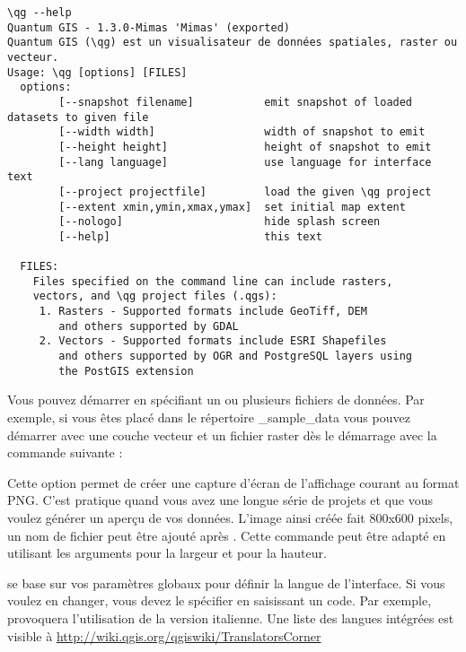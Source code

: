 \small
\begin{verbatim}
\qg --help
Quantum GIS - 1.3.0-Mimas 'Mimas' (exported)
Quantum GIS (\qg) est un visualisateur de données spatiales, raster ou vecteur.
Usage: \qg [options] [FILES]
  options:
		[--snapshot filename]           emit snapshot of loaded datasets to given file
		[--width width]                 width of snapshot to emit
		[--height height]               height of snapshot to emit
		[--lang language]               use language for interface text
		[--project projectfile]         load the given \qg project
		[--extent xmin,ymin,xmax,ymax]  set initial map extent
		[--nologo]                      hide splash screen
		[--help]                        this text

  FILES:
    Files specified on the command line can include rasters,
    vectors, and \qg project files (.qgs):
     1. Rasters - Supported formats include GeoTiff, DEM
        and others supported by GDAL
     2. Vectors - Supported formats include ESRI Shapefiles
        and others supported by OGR and PostgreSQL layers using
        the PostGIS extension
\end{verbatim}
\normalsize

\begin{Tip} \caption{\textsc{Exemple utilisant des options de ligne de commande}}
Vous pouvez démarrer \qg en spécifiant un ou plusieurs fichiers de données. Par exemple, si vous êtes placé dans le répertoire \qg\_sample\_data vous pouvez démarrer \qg avec une couche vecteur et un fichier raster dès le démarrage avec la commande suivante : 
\end{Tip}

Cette option permet de créer une capture d'écran de l'affichage courant au format PNG. C'est pratique quand vous avez une longue série de projets et que vous voulez générer un aperçu de vos données. L'image ainsi créée fait 800x600 pixels, un nom de fichier peut être ajouté après . Cette commande peut être adapté en utilisant les arguments  pour la largeur et  pour la hauteur.

\qg se base sur vos paramètres globaux pour définir la langue de l'interface. Si vous voulez en changer, vous devez le spécifier en saisissant un code. 
Par exemple,  provoquera l'utilisation de la version italienne. Une liste des langues intégrées est visible à \url{http://wiki.qgis.org/qgiswiki/TranslatorsCorner}

